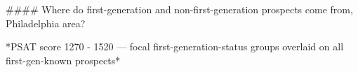 #### Where do first-generation and non-first-generation prospects come from, Philadelphia area?

*PSAT score 1270 - 1520 — focal first-generation-status groups overlaid on all first-gen-known prospects*
